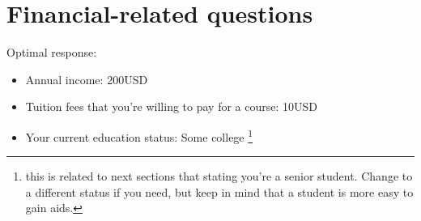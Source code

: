 \chapter{Financial-related questions}

Optimal response:

\begin{itemize}
\item Annual income: 200USD
\item Tuition fees that you're willing to pay for a course: 10USD
\item Your current education status: Some college \footnote{this is related to next sections that stating you're a senior student. Change to a different status if you need, but keep in mind that a student is more easy to gain aids.}
\end{itemize}